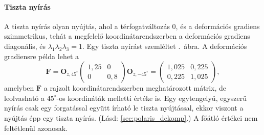 \documentclass[12pt,a4paper]{scrartcl}
\let\mathbf\bm
\begin{document}
\paragraph{Tiszta nyírás} \label{sec:tiszta_nyiras}
A tiszta nyírás olyan nyújtás, ahol a térfogatváltozás 0, és a deformációs gradiens szimmetrikus, tehát a megfelelő koordinátarendszerben a deformációs gradiens diagonális, és ${\lambda _1}{\lambda _2}{\lambda _3} = 1$. Egy tiszta nyírást szemléltet \az{\ref{fig:tiszta_nyiras}}.\ ábra. A deformációs gradiensre példa lehet a 
\[{\mathbf{F}} = {{\mathbf{O}}_{z,45^\circ }}\left( {\begin{array}{*{20}{c}}
  {1,25}&0 \\ 
  0&{0,8} 
\end{array}} \right){{\mathbf{O}}_{z, - 45^\circ }} = \left( {\begin{array}{*{20}{c}}
  {1,025}&{0,225} \\ 
  {0,225}&{1,025} 
\end{array}} \right),\]
amelyben ${\mathbf{F}}$ a rajzolt koordinátarendszerben meghatározott mátrix, de leolvasható a $45^\circ$-os koordináták melletti értéke is. Egy egytengelyű, egyszerű nyírás csak egy forgatással együtt írható le tiszta nyújtással, ekkor viszont a nyújtás épp egy tiszta nyírás. (Lásd: \ref{sec:polaris_dekomp}.) A főátló értékei nem feltétlenül azonosak.
\end{document}
